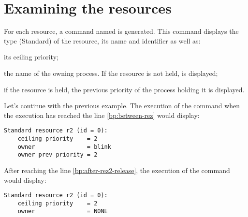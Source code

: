 \section{Examining the resources}


For each resource, a command named  is generated. This command displays the type (Standard) of the resource, its name and identifier as well as:

\begin{pitemize}
\item its ceiling priority;
\item the name of the owning process. If the resource is not held,  is displayed;
\item if the resource is held, the previous priority of the process holding it is displayed.
\end{pitemize}

Let's continue with the previous example. The execution of the command  when the execution has reached the line \ref{bp:between-rez} would display:

\begin{lstlisting}
Standard resource r2 (id = 0):
	ceiling priority    = 2
	owner               = blink
	owner prev priority = 2
\end{lstlisting} 

After reaching the line \ref{bp:after-rez2-release}, the execution of the command  would display:

\begin{lstlisting}
Standard resource r2 (id = 0):
	ceiling priority    = 2
	owner               = NONE
\end{lstlisting} 

